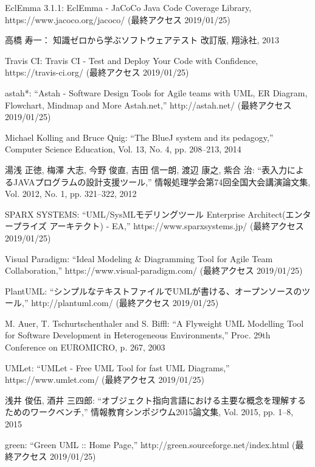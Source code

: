 \documentclass[uplatex, report, a4j, 10pt]{jsbook}
\begin{document}
\begin{thebibliography}{99}
   EclEmma 3.1.1: EclEmma - JaCoCo Java Code Coverage Library, https://www.jacoco.org/jacoco/ (最終アクセス 2019/01/25)
  
   高橋 寿一： 知識ゼロから学ぶソフトウェアテスト 改訂版, 翔泳社, 2013
  
   Travis CI: Travis CI - Test and Deploy Your Code with Confidence, https://travis-ci.org/ (最終アクセス 2019/01/25)
  
   astah*: ``Astah - Software Design Tools for Agile teams with UML, ER Diagram, Flowchart, Mindmap and More \textbar{} Astah.net,'' http://astah.net/ (最終アクセス 2019/01/25)
  
   Michael Kolling and Bruce Quig: ``The BlueJ system and its pedagogy,'' Computer Science Education, Vol. 13, No. 4, pp. 208--213, 2014
  
   湯浅 正徳, 梅澤 大志, 今野 俊直, 吉田 信一朗, 渡辺 康之, 紫合 治: ``表入力によるJAVAプログラムの設計支援ツール,'' 情報処理学会第74回全国大会講演論文集, Vol. 2012, No. 1, pp. 321--322, 2012
  
   SPARX SYSTEMS: ``UML/SysMLモデリングツール Enterprise Architect(エンタープライズ アーキテクト) - EA,'' https://www.sparxsystems.jp/ (最終アクセス 2019/01/25)
  
   Visual Paradigm: ``Ideal Modeling \& Diagramming Tool for Agile Team Collaboration,'' https://www.visual-paradigm.com/ (最終アクセス 2019/01/25)
  
   PlantUML: ``シンプルなテキストファイルでUMLが書ける、オープンソースのツール,'' http://plantuml.com/ (最終アクセス 2019/01/25)
  
   M. Auer, T. Tschurtschenthaler and S. Biffl: ``A Flyweight UML Modelling Tool for Software Development in Heterogeneous Environments,'' Proc. 29th Conference on EUROMICRO, p. 267, 2003
  
   UMLet: ``UMLet - Free UML Tool for fast UML Diagrams,'' https://www.umlet.com/ (最終アクセス 2019/01/25)
  
   浅井 俊伍, 酒井 三四郎: ``オブジェクト指向言語における主要な概念を理解するためのワークベンチ,'' 情報教育シンポジウム2015論文集, Vol. 2015, pp. 1--8, 2015
  
   green: ``Green UML :: Home Page,'' http://green.sourceforge.net/index.html (最終アクセス 2019/01/25)
  

\end{thebibliography}
\end{document}
